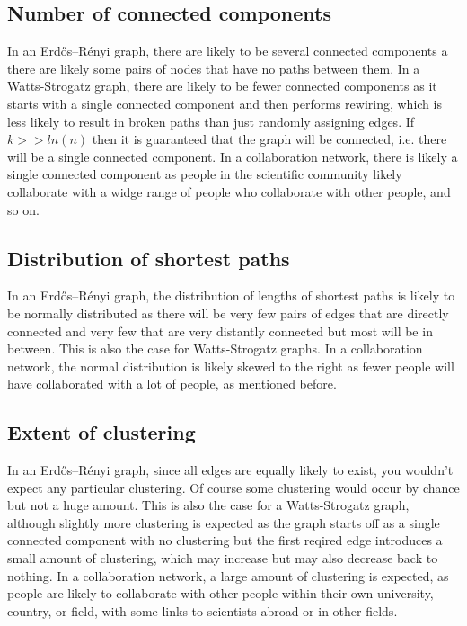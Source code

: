 \documentclass[12pt]{article}
\begin{document}
\subsection*{Number of connected components}

In an Erdős–Rényi graph, there are likely to be several connected components a there are likely some pairs of nodes that have no paths between them. In a Watts-Strogatz graph, there are likely to be fewer connected components as it starts with a single connected component and then performs rewiring, which is less likely to result in broken paths than just randomly assigning edges. If $k >> ln(n)$ then it is guaranteed that the graph will be connected, i.e. there will be a single connected component. In a collaboration network, there is likely a single connected component as people in the scientific community likely collaborate with a widge range of people who collaborate with other people, and so on.

\subsection*{Distribution of shortest paths}

In an Erdős–Rényi graph, the distribution of lengths of shortest paths is likely to be normally distributed as there will be very few pairs of edges that are directly connected and very few that are very distantly connected but most will be in between. This is also the case for Watts-Strogatz graphs. In a collaboration network, the normal distribution is likely skewed to the right as fewer people will have collaborated with a lot of people, as mentioned before.

\subsection*{Extent of clustering}

In an Erdős–Rényi graph, since all edges are equally likely to exist, you wouldn't expect any particular clustering. Of course some clustering would occur by chance but not a huge amount. This is also the case for a Watts-Strogatz graph, although slightly more clustering is expected as the graph starts off as a single connected component with no clustering but the first reqired edge introduces a small amount of clustering, which may increase but may also decrease back to nothing. In a collaboration network, a large amount of clustering is expected, as people are likely to collaborate with other people within their own university, country, or field, with some links to scientists abroad or in other fields.
\end{document}
